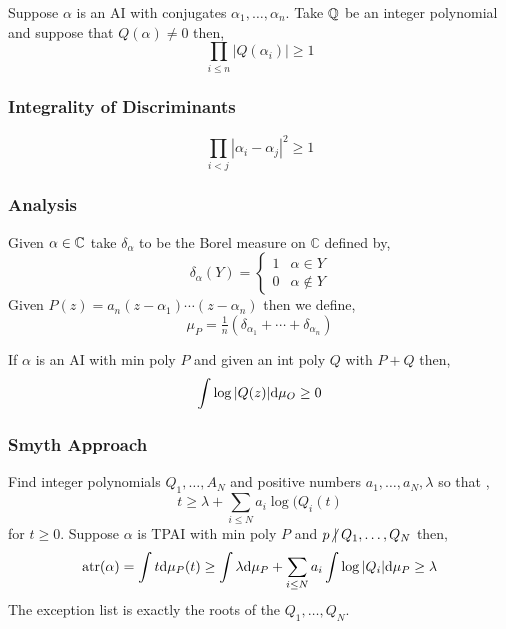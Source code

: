 \documentclass[12pt]{article}
\renewcommand{\C}{\mathbb{C}}
\newcommand{\atr}{\mathrm{atr}}
\begin{document}
Suppose $\alpha$ is an AI with conjugates $\alpha_1, \dots, \alpha_n$. Take $\mathbb{Q}$ be an integer polynomial and suppose that $Q(\alpha) \neq 0$ then,
\[ \prod_{i \le n} |Q(\alpha_i)| \ge 1 \]

\subsubsection{Integrality of Discriminants}

\[ \prod_{i < j} |\alpha_i - \alpha_j|^2 \ge 1 \]

\subsubsection{Analysis}

\begin{defn}
Given $\alpha \in \mathbb{C}$ take $\delta_\alpha$ to be the Borel measure on $\C$ defined by,
\[ \delta_\alpha(Y) = 
\begin{cases}
1 & \alpha \in Y 
\\
0 & \alpha \notin Y 
\end{cases} \]
Given $P(z) = a_n(z - \alpha_1) \cdots (z - \alpha_n)$ then we define,
\[ \mu_P = \tfrac{1}{n}(\delta_{\alpha_1} + \cdots + \delta_{\alpha_n}) \]

\begin{prop}
If $\alpha$ is an AI with min poly $P$ and given an int poly $Q$ with $P + Q$ then,
\[ \int \log{|Q(z)|} \mathrm{d}{\mu_O} \ge 0 \]
\end{prop}

\subsubsection{Smyth Approach}

Find integer polynomials $Q_1, \dots, A_N$ and positive numbers $a_1, \dots, a_N, \lambda$ so that ,
\[ t \ge \lambda + \sum_{i \le N} a_i \log{(Q_i(t)} \]
for $t \ge 0$. Suppose $\alpha$ is TPAI with min poly $P$ and $p \ndivides Q_1, \dots, Q_N$ then,
\[ \atr(\alpha) = \int t \d{\mu_P}(t) \ge \int \lambda \d{\mu_P} + \sum_{i \le N} a_i \int \log{|Q_i|} \d{\mu_P} \ge \lambda \]
The exception list is exactly the roots of the $Q_1, \dots, Q_N$. 
\end{defn}
\end{document}
